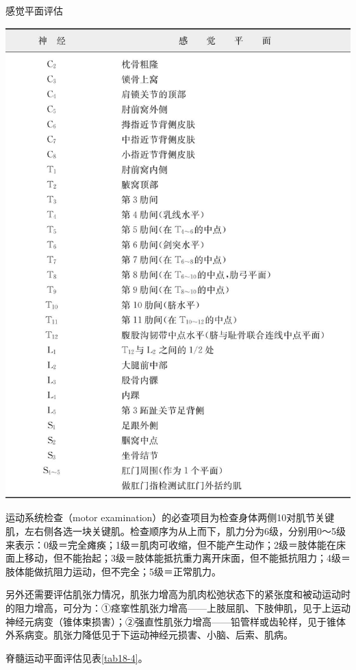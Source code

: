 \begin{table}[htbp]
\centering
\caption{感觉平面评估}
\label{tab18-3}
\includegraphics{./images/Image00143.jpg}
\end{table}

运动系统检查（motor
examination）的必查项目为检查身体两侧10对肌节关键肌，左右侧各选一块关键肌。检查顺序为从上而下，肌力分为6级，分别用0～5级来表示：0级＝完全瘫痪；1级＝肌肉可收缩，但不能产生动作；2级＝肢体能在床面上移动，但不能抬起；3级＝肢体能抵抗重力离开床面，但不能抵抗阻力；4级＝肢体能做抗阻力运动，但不完全；5级＝正常肌力。

另外还需要评估肌张力情况，肌张力增高为肌肉松弛状态下的紧张度和被动运动时的阻力增高，可分为：①痉挛性肌张力增高------上肢屈肌、下肢伸肌，见于上运动神经元病变（锥体束损害）；②强直性肌张力增高------铅管样或齿轮样，见于锥体外系病变。肌张力降低见于下运动神经元损害、小脑、后索、肌病。

脊髓运动平面评估见表\ref{tab18-4}。

